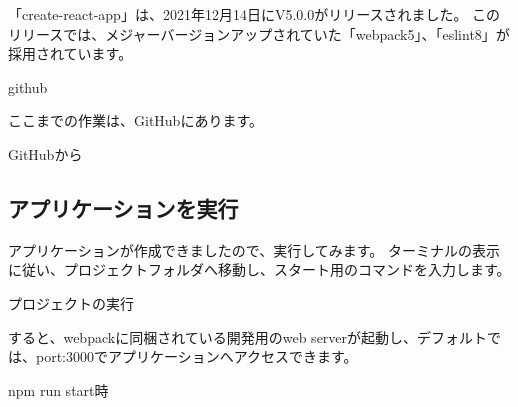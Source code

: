 \begin{starterquote}

「create{-}react{-}app」は、2021年12月14日にV5.0.0がリリースされました。
このリリースでは、メジャーバージョンアップされていた「webpack5」、「eslint8」が採用されています。

\end{starterquote}
\begin{starternote}[]{github}

ここまでの作業は、GitHubにあります。

\def\startercodeblockfontsize{}
\begin{starterterminal}[]{GitHubから}\end{starterterminal}
\end{starternote}

\subsection{アプリケーションを実行}
\keeplastskip{
  \label{sec:2-1-1}
  \label{sec-02yarnstart}
  \par\nobreak
}

アプリケーションが作成できましたので、実行してみます。
ターミナルの表示に従い、プロジェクトフォルダへ移動し、スタート用のコマンドを入力します。

\def\startercodeblockfontsize{}
\begin{starterterminal}[]{プロジェクトの実行}\end{starterterminal}

すると、webpackに同梱されている開発用のweb serverが起動し、デフォルトでは、port:3000でアプリケーションへアクセスできます。

\def\startercodeblockfontsize{}
\begin{starterterminal}[]{npm run start時}\end{starterterminal}

